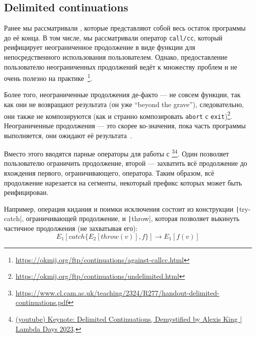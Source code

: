 





\subsection{Delimited continuations}

Ранее мы рассматривали , которые представляют собой весь остаток программы до её конца.
В том числе, мы рассматривали оператор \texttt{call/cc}, который реифицирует неограниченное продолжение в виде функции для непосредственного использования пользователем.
Однако, предоставление пользователю неограниченных продолжений ведёт к множеству проблем и не очень полезно на практике~\footnote{\url{https://okmij.org/ftp/continuations/against-callcc.html}}.

Более того, неограниченные продолжения де-факто --- не совсем функции, так как они не возвращают результата (он уже ``beyond the grave''), следовательно, они также не композируются (как и странно композировать \texttt{abort} с \texttt{exit})\footnote{\url{https://okmij.org/ftp/continuations/undelimited.html}}.
Неограниченные продолжения --- это скорее ко-значения, пока часть программы выполняется, они ожидают её результата~\cite{curien2000duality}.

Вместо этого вводятся парные операторы для работы с \footnote{\url{https://www.cl.cam.ac.uk/teaching/2324/R277/handout-delimited-continuations.pdf}}\footnote{\href{https://youtu.be/TE48LsgVlIU?si=cBdUCzYwYWpwPkkh}{(youtube)  Keynote: Delimited Continuations, Demystified by Alexis King | Lambda Days 2023}.}.
Один позволяет пользователю ограничить продолжение, второй --- захватить всё продолжение до вхождения первого, ограничивающего, оператора.
Таким образом, всё продолжение нарезается на сегменты, некоторый префикс которых может быть реифицирован.

Например, операция кидания и поимки исключения состоит из конструкции \texttt|try-catch|, ограничивающей продолжение, и \texttt|throw|, которая позволяет выкинуть частичное продолжения (не захватывая его):
\[
    E_1[catch\{E_2[throw(v)], f\}] \to E_1[f(v)]
\]

